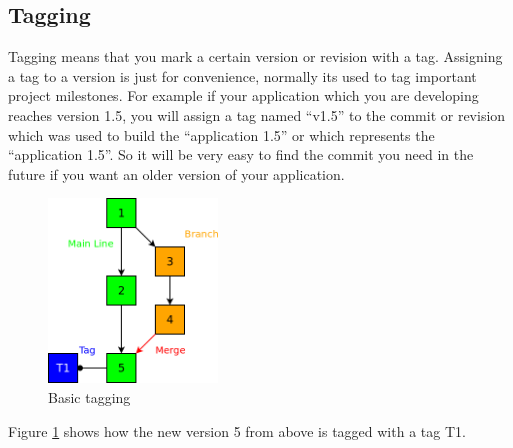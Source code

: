 \subsection{Tagging}

Tagging means that you mark a certain version or revision with a tag. 
Assigning a tag to a version is just for convenience, normally its used to tag important project milestones. 
For example if your application which you are developing reaches version 1.5, you will assign a tag named “v1.5” 
to the commit or revision which was used to build the “application 1.5” or which represents the “application 1.5”. 
So it will be very easy to find the commit you need in the future if you want an older version of your application.

\begin{figure}[ht]
  \centering
  \includegraphics[width=0.4\textwidth]{img/Gen_Tag}
  \caption{Basic tagging}
  \label{fig:gen_tag}
\end{figure}

Figure \ref{fig:gen_tag} shows how the new version 5 from above is tagged with a tag T1.
